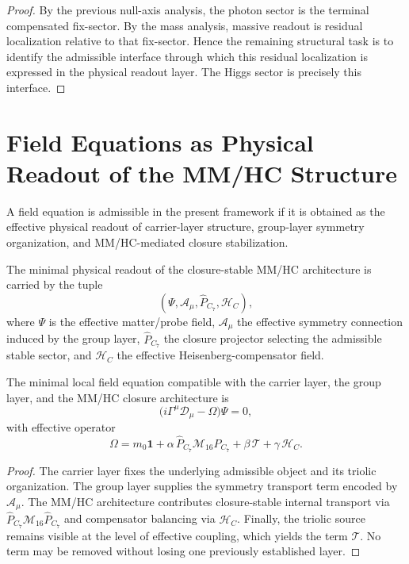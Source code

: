 \begin{proof}
By the previous null-axis analysis, the photon sector is the terminal
compensated fix-sector. By the mass analysis, massive readout is residual
localization relative to that fix-sector. Hence the remaining structural task
is to identify the admissible interface through which this residual
localization is expressed in the physical readout layer. The Higgs sector is
precisely this interface.
\end{proof}

\section{Field Equations as Physical Readout of the MM/HC Structure}
\label{sec:field-readout}

\begin{definition}
\label{def:field-readout-principle}
A field equation is admissible in the present framework if it is obtained as
the effective physical readout of carrier-layer structure, group-layer symmetry
organization, and MM/HC-mediated closure stabilization.
\end{definition}

\begin{definition}
The minimal physical readout of the closure-stable MM/HC architecture is
carried by the tuple
\[
(\Psi,\mathcal A_\mu,\hat P_{C_7},\mathcal H_C),
\]
where $\Psi$ is the effective matter/probe field, $\mathcal A_\mu$ the
effective symmetry connection induced by the group layer,
$\hat P_{C_7}$ the closure projector selecting the admissible stable sector,
and $\mathcal H_C$ the effective Heisenberg-compensator field.
\end{definition}

\begin{theorem}
\label{thm:minimal-mmhc-field-equation}
The minimal local field equation compatible with the carrier layer, the group
layer, and the MM/HC closure architecture is
\[
\bigl(i\Gamma^\mu\mathcal D_\mu-\Omega\bigr)\Psi=0,
\]
with effective operator
\[
\Omega
=
m_0\mathbf 1
+\alpha\,\hat P_{C_7}\mathcal M_{16}\hat P_{C_7}
+\beta\,\mathcal T
+\gamma\,\mathcal H_C.
\]
\end{theorem}

\begin{proof}
The carrier layer fixes the underlying admissible object and its triolic
organization. The group layer supplies the symmetry transport term encoded by
$\mathcal A_\mu$. The MM/HC architecture contributes closure-stable internal
transport via $\hat P_{C_7}\mathcal M_{16}\hat P_{C_7}$ and compensator
balancing via $\mathcal H_C$. Finally, the triolic source remains visible at
the level of effective coupling, which yields the term $\mathcal T$. No term
may be removed without losing one previously established layer.
\end{proof}

